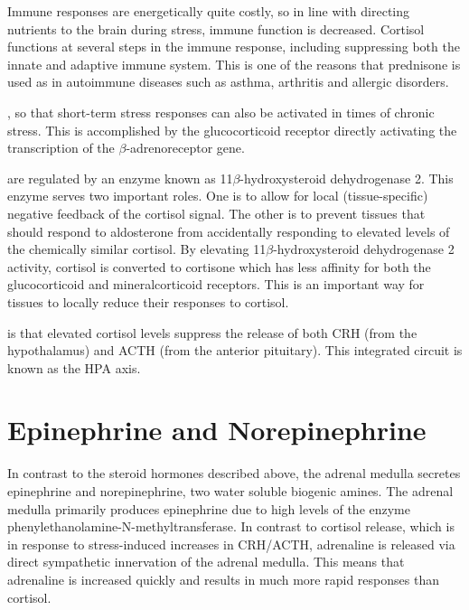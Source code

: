 \documentclass{tufte-handout}
\begin{document}
  Immune responses are energetically quite costly, so in line with directing nutrients to the brain during stress, immune function is decreased.  Cortisol functions at several steps in the immune response, including suppressing both the innate and adaptive immune system.  This is one of the reasons that prednisone is used as in autoimmune diseases such as asthma, arthritis and allergic disorders.

, so that short-term stress responses can also be activated in times of chronic stress.  This is accomplished by the glucocorticoid receptor directly activating the transcription of the $\beta$-adrenoreceptor gene\cite{Hadcock1988}.

 are regulated by an enzyme known as 11$\beta$-hydroxysteroid dehydrogenase 2.  This enzyme serves two important roles.  One is to allow for local (tissue-specific) negative feedback of the cortisol signal.  The other is to prevent tissues that should respond to aldosterone from accidentally responding to elevated levels of the chemically similar cortisol.  By elevating 11$\beta$-hydroxysteroid dehydrogenase 2 activity, cortisol is converted to cortisone which has less affinity for both the glucocorticoid and mineralcorticoid receptors.  This is an important way for tissues to locally reduce their responses to cortisol.

 is that elevated cortisol levels suppress the release of both CRH (from the hypothalamus) and ACTH (from the anterior pituitary).  This integrated circuit is known as the HPA axis.  

\section{Epinephrine and Norepinephrine}

In contrast to the steroid hormones described above, the adrenal medulla secretes epinephrine and norepinephrine, two water soluble biogenic amines.  The adrenal medulla primarily produces epinephrine due to high levels of the enzyme phenylethanolamine-N-methyltransferase.  In contrast to cortisol release, which is in response to stress-induced increases in CRH/ACTH, adrenaline is released via direct sympathetic innervation of the adrenal medulla.  This means that adrenaline is increased quickly and results in much more rapid responses than cortisol.  
\end{document}
